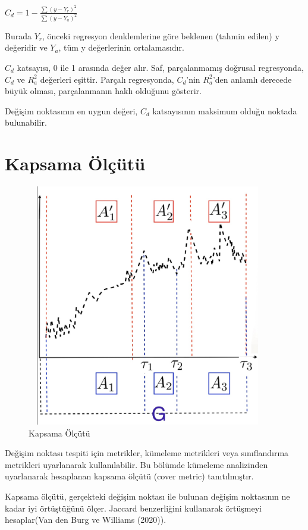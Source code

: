 \documentclass[12pt,twoside]{deuthesis}
\begin{document}
\(C_{d} = 1 - \frac{\sum (y-Y_{r})^{2}}{\sum (y-Y_{a})^{2}}\)

Burada \(Y_{r}\), önceki regresyon denklemlerine göre beklenen (tahmin edilen) y değeridir ve \(Y_{a}\), tüm y değerlerinin ortalamasıdır.

\(C_{d}\) katsayısı, 0 ile 1 arasında değer alır. Saf, parçalanmamış doğrusal regresyonda, \(C_{d}\) ve \(R_{a}^2\) değerleri eşittir. Parçalı regresyonda, \(C_{d}\)'nin \(R_{a}^2\)'den anlamlı derecede büyük olması, parçalanmanın haklı olduğunu gösterir.

Değişim noktasının en uygun değeri, \(C_{d}\) katsayısının maksimum olduğu noktada bulunabilir.

\section{Kapsama Ölçütü}\label{kapsama-uxf6luxe7uxfctuxfc}

\begin{figure}
\includegraphics[width=400px,height=400px]{figure/cover} \caption{Kapsama Ölçütü}\label{fig:unnamed-chunk-1}
\end{figure}

Değişim noktası tespiti için metrikler, kümeleme metrikleri veya sınıflandırma metrikleri uyarlanarak kullanılabilir. Bu bölümde kümeleme analizinden uyarlanarak hesaplanan kapsama ölçütü (cover metric) tanıtılmıştır.

Kapsama ölçütü, gerçekteki değişim noktası ile bulunan değişim noktasının ne kadar iyi örtüştüğünü ölçer. Jaccard benzerliğini kullanarak örtüşmeyi hesaplar(Van den Burg ve Williams (2020)).
\end{document}
